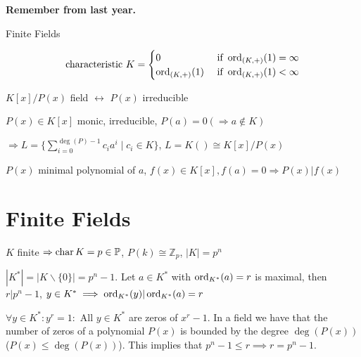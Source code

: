 

\textbf{Remember from last year.}

Finite Fields

\[
  \text{characteristic } K =
  \begin{cases}
    0                & \text{ if } \operatorname{ord}_{(K,+)} (1) = \infty \\
    \operatorname{ord}_{(K,+)} (1) & \text{ if } \operatorname{ord}_{(K,+)} (1) < \infty \\
  \end{cases}
\]

$K[x] / P(x)$ field $\leftrightarrow$ $P(x)$ irreducible

$P(x) \in K[x]$ monic, irreducible, $P(a) = 0 ( \Rightarrow a \not\in K)$

$\Rightarrow L = \{ \sum_{i=0}^{\deg(P)-1} c_i a^i \mid c_i \in K \}$,
$L = K() \cong K[x] / P(x)$

$P(x)$ minimal polynomial of $a$, $f(x) \in K[x], f(a) = 0 \Rightarrow P(x)|f(x)$

\section{Finite Fields}

$K$ finite $\Rightarrow \operatorname{char} K = p \in \mathbb{P}$, $P(k) \cong \mathbb{Z}_p$, $|K| = p^n$

$|K^{*}| = | K \backslash \{0\}| = p^n -1$. Let $a \in K^{*}$ with $\operatorname{ord}_{K^{*}}(a)=r$ is maximal, then $ r| p^n-1$,
$y \in K^{*} \implies \operatorname{ord}_{K^{*}}(y) | \operatorname{ord}_{K^{*}}(a) = r$

$\forall y \in K^{*}: y^r = 1:$ All $y \in K^{*}$ are zeros of $x^r -1$.
In a field we have that the number of zeros of a polynomial $P(x)$ is bounded by the degree $\deg(P(x))$ ($P(x) \leq \deg(P(x))$). This implies that $p^n-1 \leq r \implies r = p^n-1$.

